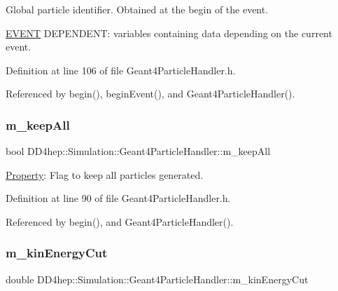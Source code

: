 Global particle identifier. Obtained at the begin of the event. 

\hyperlink{namespace_e_v_e_n_t}{E\+V\+E\+NT} D\+E\+P\+E\+N\+D\+E\+NT\+: variables containing data depending on the current event. 

Definition at line 106 of file Geant4\+Particle\+Handler.\+h.



Referenced by begin(), begin\+Event(), and Geant4\+Particle\+Handler().

\hypertarget{class_d_d4hep_1_1_simulation_1_1_geant4_particle_handler_ab2b6cb17640a8b5cc428b2142965a4e5}{}\label{class_d_d4hep_1_1_simulation_1_1_geant4_particle_handler_ab2b6cb17640a8b5cc428b2142965a4e5} 
\subsubsection{\texorpdfstring{m\+\_\+keep\+All}{m\_keepAll}}
{\footnotesize\ttfamily bool D\+D4hep\+::\+Simulation\+::\+Geant4\+Particle\+Handler\+::m\+\_\+keep\+All\hspace{0.3cm}{\ttfamily [protected]}}



\hyperlink{class_d_d4hep_1_1_property}{Property}\+: Flag to keep all particles generated. 



Definition at line 90 of file Geant4\+Particle\+Handler.\+h.



Referenced by begin(), and Geant4\+Particle\+Handler().

\hypertarget{class_d_d4hep_1_1_simulation_1_1_geant4_particle_handler_ad3d0abf4ae9bc3f3176d9f05dab96cf4}{}\label{class_d_d4hep_1_1_simulation_1_1_geant4_particle_handler_ad3d0abf4ae9bc3f3176d9f05dab96cf4} 
\subsubsection{\texorpdfstring{m\+\_\+kin\+Energy\+Cut}{m\_kinEnergyCut}}
{\footnotesize\ttfamily double D\+D4hep\+::\+Simulation\+::\+Geant4\+Particle\+Handler\+::m\+\_\+kin\+Energy\+Cut\hspace{0.3cm}{\ttfamily [protected]}}



